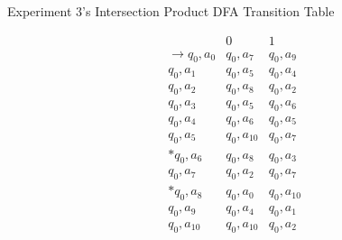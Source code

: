 \documentclass[conference]{IEEEtran}
\begin{document}
\begin{table}[h!]
    \caption{Experiment 3's Intersection Product DFA Transition Table}
    \begin{displaymath}
        \begin{array}{r|c|c|}
        & 0 & 1 \\
        \hline
        \rightarrow q_0,a_0 & q_0,a_7 & q_0,a_9 \\
        q_0,a_1 & q_0,a_5 & q_0,a_4 \\
        q_0,a_2 & q_0,a_8 & q_0,a_2 \\
        q_0,a_3 & q_0,a_5 & q_0,a_6 \\
        q_0,a_4 & q_0,a_6 & q_0,a_5 \\
        q_0,a_5 & q_0,a_{10} & q_0,a_7 \\
        * q_0,a_6 & q_0,a_8 & q_0,a_3 \\
        q_0,a_7 & q_0,a_2 & q_0,a_7 \\
        * q_0,a_8 & q_0,a_0 & q_0,a_{10} \\
        q_0,a_9 & q_0,a_4 & q_0,a_1 \\
        q_0,a_{10} & q_0,a_{10} & q_0,a_2 \\
        \end{array}
    \end{displaymath}
    \label{table-exp3-dfaprodi}
\end{table}
\end{document}
